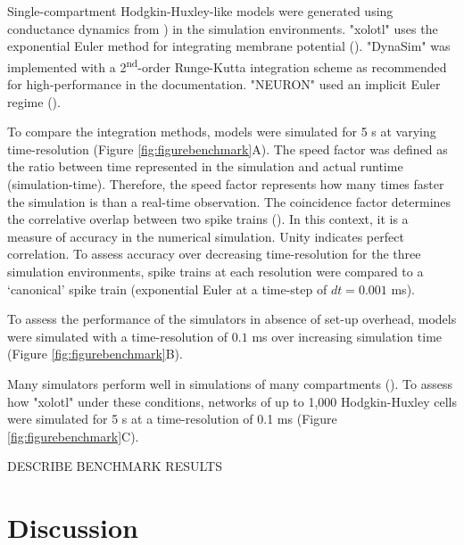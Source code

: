 \documentclass{frontiersSCNS} %
\begin{document}
Single-compartment Hodgkin-Huxley-like models were generated using conductance dynamics from \cite{liuModelNeuronActivitydependent1998}) in the simulation environments. "xolotl" uses the exponential Euler method for integrating membrane potential (\cite{dayanTheoreticalNeuroscience2001}). "DynaSim" was implemented with a 2\textsuperscript{nd}-order Runge-Kutta integration scheme as recommended for high-performance in the documentation. "NEURON" used an implicit Euler regime (\cite{hinesNEURONSimulationEnvironment1997}).

To compare the integration methods, models were simulated for 5 s at varying time-resolution (Figure \ref{fig:figurebenchmark}A). The speed factor was defined as the ratio between time represented in the simulation and actual runtime (simulation-time). Therefore, the speed factor represents how many times faster the simulation is than a real-time observation. The coincidence factor determines the correlative overlap between two spike trains (\cite{jolivetBenchmarkTestQuantitative2008}). In this context, it is a measure of accuracy in the numerical simulation. Unity indicates perfect correlation. To assess accuracy over decreasing time-resolution for the three simulation environments, spike trains at each resolution were compared to a `canonical' spike train (exponential Euler at a time-step of $dt = 0.001$ ms). 

To assess the performance of the simulators in absence of set-up overhead, models were simulated with a time-resolution of $0.1$ ms over increasing simulation time (Figure \ref{fig:figurebenchmark}B).

Many simulators perform well in simulations of many compartments (\cite{bretteSimulationNetworksSpiking2007, sherfeyDynaSimMATLABToolbox2018, vitayANNarchyCodeGeneration2015, delormeSpikeNETEventdrivenSimulation2003}). To assess how "xolotl" under these conditions, networks of up to 1,000 Hodgkin-Huxley cells were simulated for 5 s at a time-resolution of 0.1 ms (Figure \ref{fig:figurebenchmark}C).

DESCRIBE BENCHMARK RESULTS

%
%
%
%
%
%

\section{Discussion}
\label{discussion}
\end{document}
